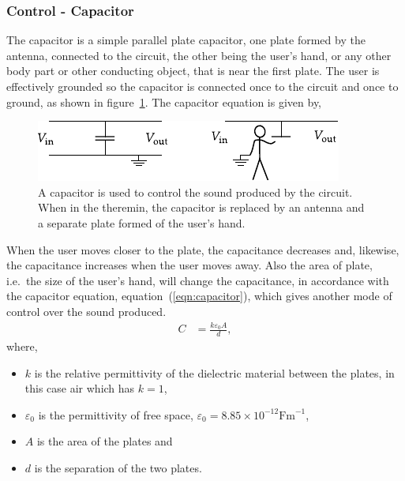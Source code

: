 \subsubsection{Control - Capacitor}
The capacitor is a simple parallel plate capacitor, one plate formed by the antenna, connected to the circuit, the other being the user's hand, or any other body part or other conducting object, that is near the first plate. The user is effectively grounded so the capacitor is connected once to the circuit and once to ground, as shown in figure~\ref{fig:capacitor}. The capacitor equation is given by,

\begin{figure}[htbp]
  \begin{center}
    \includegraphics[scale=1.2]{report_img/plate_capacitor}
    \caption{A capacitor is used to control the sound produced by the circuit. When in the theremin, the capacitor is replaced by an antenna and a separate plate formed of the user's hand.}
    \label{fig:capacitor}
  \end{center}
\end{figure}

When the user moves closer to the plate, the capacitance decreases and, likewise, the capacitance increases when the user moves away. Also the area of plate, i.e.\ the size of the user's hand, will change the capacitance, in accordance with the capacitor equation, equation~(\ref{eqn:capacitor}), which gives another mode of control over the sound produced.
\begin{align}
  C &= \frac{k\varepsilon_0 A}{d}, \label{eqn:capacitor}
\end{align}
where,
\begin{itemize}
  \item $k$ is the relative permittivity of the dielectric material between the plates, in this case air which has $k=1$,
  \item $\varepsilon_0$ is the permittivity of free space, $\varepsilon_0 = 8.85 \times 10^{-12} \text{Fm}^{-1}$,
  \item $A$ is the area of the plates and
  \item $d$ is the separation of the two plates.
\end{itemize}

\newpage 
